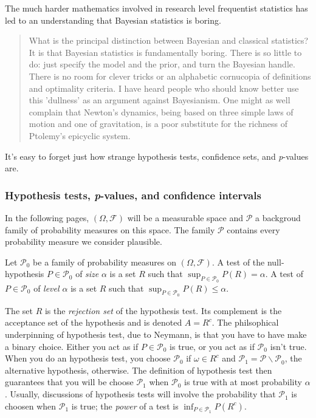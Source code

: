 The much harder mathematics involved in research level frequentist
statistics has led to an understanding that Bayesian statistics is
boring. 
\begin{quote}
What is the principal distinction between Bayesian and classical statistics?
It is that Bayesian statistics is fundamentally boring. There is so
little to do: just specify the model and the prior, and turn the Bayesian
handle. There is no room for clever tricks or an alphabetic cornucopia
of definitions and optimality criteria. I have heard people who should
know better use this 'dullness' as an argument against Bayesianism.
One might as well complain that Newton's dynamics, being based on
three simple laws of motion and one of gravitation, is a poor substitute
for the richness of Ptolemy's epicyclic system. 
\end{quote}
It's easy to forget just how strange hypothesis tests, confidence
sets, and \emph{p}-values are. 

\subsubsection{Hypothesis tests, \emph{p}-values, and confidence intervals}

In the following pages, $(\Omega,\mathcal{\mathcal{F}})$ will be
a measurable space and $\mathcal{P}$ a backgroud family of probability
measures on this space. The family $\mathcal{P}$ contains every probability
measure we consider plausible. 
\begin{definition}
\parencite[][Chapter 3.1]{Lehmann2005-sp} Let $\mathcal{P}_{0}$ be a family
of probability measures on $(\Omega,\mathcal{F})$. A test of the
null-hypothesis $P\in\mathcal{P}_{0}$ of \emph{size} $\alpha$ is
a set $R$ such that $\sup_{P\in\mathcal{P}_{0}}P(R)=\alpha.$ A test
of $P\in\mathcal{P}_{0}$ of \emph{level $\alpha$ }is a set $R$
such that $\sup_{P\in\mathcal{P}_{0}}P(R)\leq\alpha.$
\end{definition}

The set $R$ is the \emph{rejection set} of the hypothesis test. Its
complement is the acceptance set of the hypothesis and is denoted
$A=R^{c}$. The philsophical underpinning of hypothesis test, due
to Neymann, is that you have to have make a binary choice. Either
you act as if $P\in\mathcal{P}_{0}$ is true, or you act as if $\mathcal{P}_{0}$
isn't true. When you do an hypothesis test, you choose $\mathcal{P}_{0}$
if $\omega\in R^{c}$ and $\mathcal{P}_{1}=\mathcal{P\backslash P}_{0}$,
the alternative hypothesis, otherwise. The definition of hypothesis
test then guarantees that you will be choose $\mathcal{P}_{1}$ when
$\mathcal{P}_{0}$ is true with at most probability $\alpha$. Usually,
discussions of hypothesis tests will involve the probability that
$\mathcal{P}_{1}$ is choosen when $\mathcal{P}_{1}$ is true; the
\emph{power} of a test is $\inf_{P\in\mathcal{P}_{1}}P(R^{c})$. 

